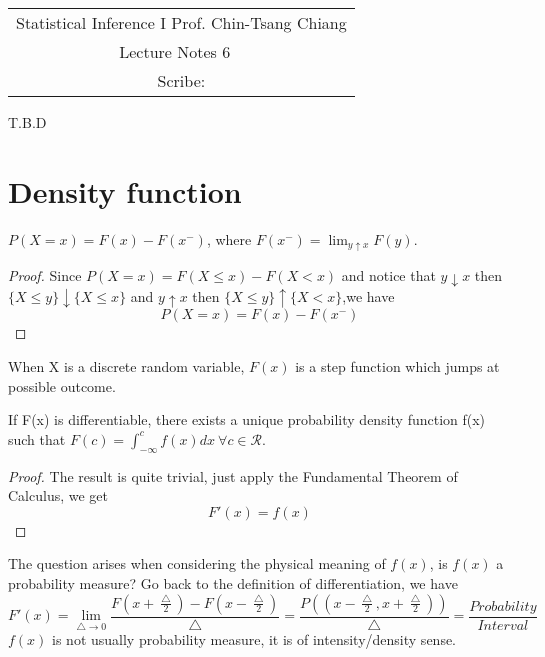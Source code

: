\documentclass[../Probability_Theory.tex]{subfiles}
\begin{document}
	\begin{center}
		\renewcommand{\arraystretch}{2}
		\begin{bfseries}
			\begin{tabular}{|c|}
				\hline
				Statistical Inference I \hfill Prof. Chin-Tsang Chiang\\
				\hspace{15em} {\large Lecture Notes 6} \hspace{15em}\ \\
				\lecdate \hfill Scribe: \scribe\\
				\hline
			\end{tabular}
			\renewcommand{\arraystretch}{1}
		\end{bfseries}
	\end{center}

T.B.D
\section{Density function}
\begin{theorem}
$P(X=x)=F(x)-F(x^-)$, where $F(x^-)=\lim_{y\uparrow x}F(y).$
\end{theorem}
\begin{proof}
Since $P(X=x)=F(X\leq x)-F(X<x)$ and notice that  $y\downarrow x$ then $\{X\leq y\}\downarrow\{X\leq x\}$ and $y\uparrow x$ then $\{X\leq y\}\uparrow\{X<x \}$,we have $$P(X=x)=F(x)-F(x^-)$$
\end{proof}
When X is a discrete random variable, $F(x)$ is a step function which jumps at possible outcome.
\begin{theorem}
If F(x) is differentiable, there exists a unique probability density function f(x) such that $F(c)=\int_{-\infty}^c f(x)dx\ \forall c\in \mathcal{R}.$  
\end{theorem}
\begin{proof}
The result is quite trivial, just apply the Fundamental Theorem of Calculus, we get $$F'(x)=f(x)$$ 
\end{proof}
The question arises when considering the physical meaning of $f(x)$, is $f(x)$ a probability measure? Go back to the definition of differentiation, we have
$$F'(x)=\lim_{\bigtriangleup\rightarrow 0}\frac{F(x+\frac{\bigtriangleup}{2})-F(x-\frac{\bigtriangleup}{2})}{\bigtriangleup}=\frac{P((x-\frac{\bigtriangleup}{2},x+\frac{\bigtriangleup}{2}))}{\bigtriangleup}=\frac{Probability}{Interval}$$ 
$f(x)$ is not usually probability measure, it is of intensity/density sense.
\end{document}
